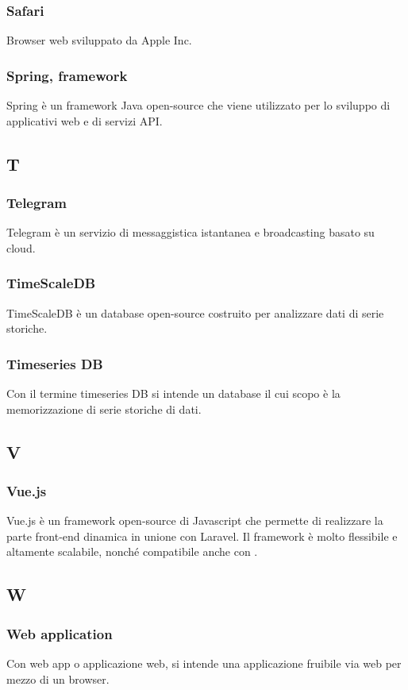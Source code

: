 \subsubsection*{Safari}
Browser web sviluppato da Apple Inc.
\subsubsection*{Spring, framework}  Spring è un framework Java open-source che viene utilizzato per lo sviluppo di applicativi web e di servizi API.
\subsection{T}
\subsubsection*{Telegram}  Telegram è un servizio di messaggistica istantanea e broadcasting basato su cloud.
\subsubsection*{TimeScaleDB}  TimeScaleDB è un database open-source costruito per analizzare dati di serie storiche.
\subsubsection*{Timeseries DB}  Con il termine timeseries DB si intende un database il cui scopo è la memorizzazione di serie storiche di dati.
\subsection{V}
\subsubsection*{Vue.js}  Vue.js è un framework open-source di Javascript che permette di realizzare la parte front-end dinamica in unione con Laravel. Il framework è molto flessibile e altamente scalabile, nonché compatibile anche con .
\subsection{W}
\subsubsection*{Web application}
Con web app o applicazione web, si intende una applicazione fruibile via web per mezzo di un browser.